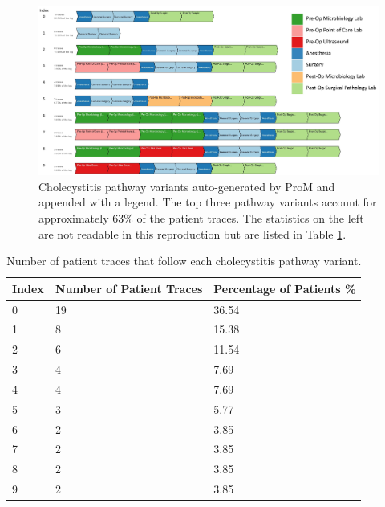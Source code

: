 \documentclass{elsarticle}
\begin{document}
\begin{figure}[t]
\hspace{-2cm}
\includegraphics[width=1.5\textwidth]{images/cholecystitis_variant_index_anes.jpg}
\caption{Cholecystitis pathway variants auto-generated by ProM and appended with a legend. The top three pathway variants account for approximately 63\% of the patient traces. The statistics on the left are not readable in this reproduction but are listed in Table \ref{table:cholecystitis variant table}.}
\label{fig:cholecystitis pathway variants}
\end{figure}

\begin{table}[t]
\centering
\caption{Number of patient traces that follow each cholecystitis pathway variant.}
\label{table:cholecystitis variant table}
\begin{tabular}{ l l l }
 \hline
 Index & Number of Patient Traces & Percentage of Patients \% \\ 
 \hline
 0 & 19 & 36.54\\ 
 \hline
 1 & 8 & 15.38\\ 
 \hline
 2 & 6 & 11.54\\ 
 \hline
 3 & 4 & 7.69\\ 
 \hline
 4 & 4 & 7.69\\ 
 \hline
 5 & 3 & 5.77\\ 
 \hline
 6 & 2 & 3.85\\ 
 \hline
 7 & 2 & 3.85\\ 
 \hline
 8 & 2 & 3.85\\ 
 \hline
 9 & 2 & 3.85\\ 
 \hline
\end{tabular}
\end{table}
\end{document}
